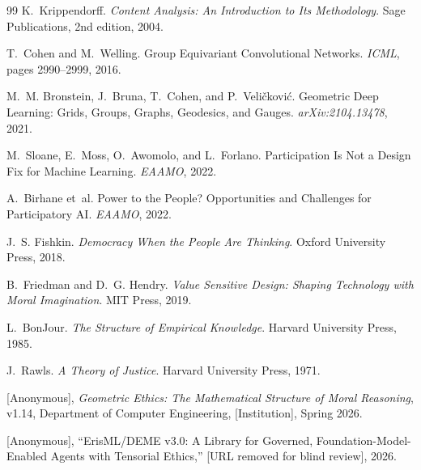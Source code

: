 \documentclass[12pt]{article}
\begin{document}
\begin{thebibliography}{99}
K.~Krippendorff.
\newblock \emph{Content Analysis: An Introduction to Its Methodology}.
\newblock Sage Publications, 2nd edition, 2004.

T.~Cohen and M.~Welling.
\newblock Group Equivariant Convolutional Networks.
\newblock \emph{ICML}, pages 2990--2999, 2016.

M.~M. Bronstein, J.~Bruna, T.~Cohen, and P.~Veli\v{c}kovi\'{c}.
\newblock Geometric Deep Learning: Grids, Groups, Graphs, Geodesics, and Gauges.
\newblock \emph{arXiv:2104.13478}, 2021.

M.~Sloane, E.~Moss, O.~Awomolo, and L.~Forlano.
\newblock Participation Is Not a Design Fix for Machine Learning.
\newblock \emph{EAAMO}, 2022.

A.~Birhane et~al.
\newblock Power to the People? Opportunities and Challenges for Participatory AI.
\newblock \emph{EAAMO}, 2022.

J.~S. Fishkin.
\newblock \emph{Democracy When the People Are Thinking}.
\newblock Oxford University Press, 2018.

B.~Friedman and D.~G. Hendry.
\newblock \emph{Value Sensitive Design: Shaping Technology with Moral Imagination}.
\newblock MIT Press, 2019.

L.~BonJour.
\newblock \emph{The Structure of Empirical Knowledge}.
\newblock Harvard University Press, 1985.

J.~Rawls.
\newblock \emph{A Theory of Justice}.
\newblock Harvard University Press, 1971.

[Anonymous], \emph{Geometric Ethics: The Mathematical Structure of Moral Reasoning}, v1.14, Department of Computer Engineering, [Institution], Spring 2026.

[Anonymous], ``ErisML/DEME v3.0: A Library for Governed, Foundation-Model-Enabled Agents with Tensorial Ethics,'' [URL removed for blind review], 2026.

\end{thebibliography}
\end{document}
